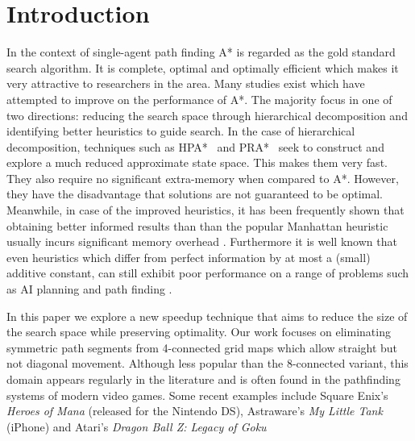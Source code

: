 \section{Introduction}
In the context of single-agent path finding A* \cite{hart68} is regarded as 
the gold standard search algorithm.
It is complete, optimal and optimally efficient which makes it very attractive 
to researchers in the area.
Many studies exist which have attempted to improve on the performance of A*. 
The majority focus in one of two directions: reducing the search space through hierarchical 
decomposition and identifying better heuristics to guide search. 
In the case of hierarchical decomposition, techniques such as
HPA*~\cite{botea04} and PRA*~\cite{sturtevant05} seek to construct and explore
a much reduced approximate state space.
This makes them very fast. 
They also require no significant extra-memory when compared to A*.
However, they have the disadvantage that solutions are not guaranteed to be optimal.
Meanwhile, in case of the improved heuristics, it has been frequently shown
that obtaining better informed results than than the popular
Manhattan heuristic usually incurs significant memory overhead 
\cite{goldberg05,Cazenave:06,bjornsson06}.
Furthermore it is well known that even heuristics which differ from perfect information 
by at most a (small) additive constant, can still exhibit poor performance on a range of 
problems such as AI planning and path finding \cite{helmert08,pohl77}.
\par
In this paper we explore a new speedup technique that aims to reduce the size of the search 
space while preserving optimality.
Our work focuses on eliminating symmetric path segments from 4-connected grid maps which
allow straight but not diagonal movement. 
Although less popular than the 8-connected variant, this domain appears regularly in the 
literature  \cite{yap02,wang08,pochter09} and is often found in the pathfinding systems of modern video games.
Some recent examples include Square Enix's \emph{Heroes of Mana} (released for the Nintendo DS),
Astraware's \emph{My Little Tank} (iPhone) and Atari's \emph{Dragon Ball Z: Legacy of Goku} 
